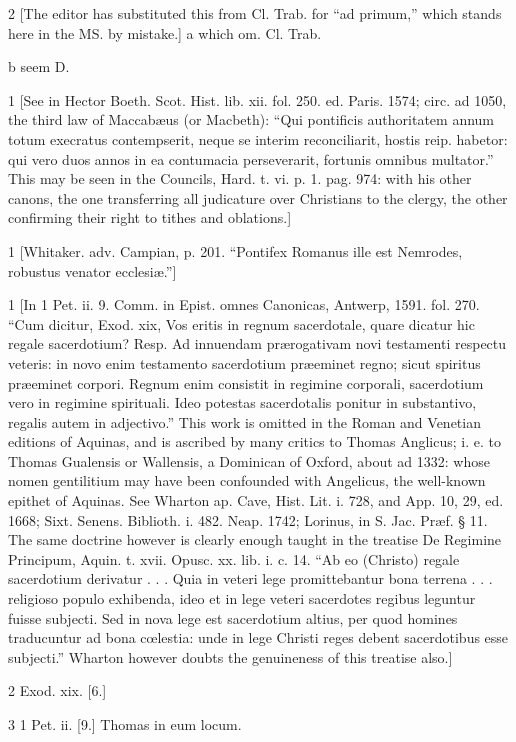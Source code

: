 2 [The editor has substituted this from Cl. Trab. for “ad primum,” which stands here in the MS. by mistake.]
a
which om. Cl. Trab.

b
seem D.

1
[See in Hector Boeth. Scot. Hist. lib. xii. fol. 250. ed. Paris. 1574; circ. ad 1050, the third law of Maccabæus (or Macbeth): “Qui pontificis authoritatem annum totum execratus contempserit, neque se interim reconciliarit, hostis reip. habetor: qui vero duos annos in ea contumacia perseverarit, fortunis omnibus multator.” This may be seen in the Councils, Hard. t. vi. p. 1. pag. 974: with his other canons, the one transferring all judicature over Christians to the clergy, the other confirming their right to tithes and oblations.]

1
[Whitaker. adv. Campian, p. 201. “Pontifex Romanus ille est Nemrodes, robustus venator ecclesiæ.”]

1
[In 1 Pet. ii. 9. Comm. in Epist. omnes Canonicas, Antwerp, 1591. fol. 270. “Cum dicitur, Exod. xix, Vos eritis in regnum sacerdotale, quare dicatur hic regale sacerdotium? Resp. Ad innuendam prærogativam novi testamenti respectu veteris: in novo enim testamento sacerdotium præeminet regno; sicut spiritus præeminet corpori. Regnum enim consistit in regimine corporali, sacerdotium vero in regimine spirituali. Ideo potestas sacerdotalis ponitur in substantivo, regalis autem in adjectivo.” This work is omitted in the Roman and Venetian editions of Aquinas, and is ascribed by many critics to Thomas Anglicus; i. e. to Thomas Gualensis or Wallensis, a Dominican of Oxford, about ad 1332: whose nomen gentilitium may have been confounded with Angelicus, the well-known epithet of Aquinas. See Wharton ap. Cave, Hist. Lit. i. 728, and App. 10, 29, ed. 1668; Sixt. Senens. Biblioth. i. 482. Neap. 1742; Lorinus, in S. Jac. Præf. § 11. The same doctrine however is clearly enough taught in the treatise De Regimine Principum, Aquin. t. xvii. Opusc. xx. lib. i. c. 14. “Ab eo (Christo) regale sacerdotium derivatur . . . Quia in veteri lege promittebantur bona terrena . . . religioso populo exhibenda, ideo et in lege veteri sacerdotes regibus leguntur fuisse subjecti. Sed in nova lege est sacerdotium altius, per quod homines traducuntur ad bona cœlestia: unde in lege Christi reges debent sacerdotibus esse subjecti.” Wharton however doubts the genuineness of this treatise also.]

2
Exod. xix. [6.]

3
1 Pet. ii. [9.] Thomas in eum locum.


